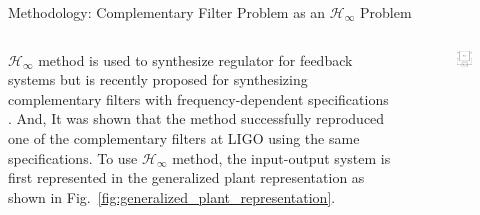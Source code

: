 \documentclass{beamer}
\begin{document}
\begin{frame}[t]
\begin{columns}[t]
\begin{column}{0.32\linewidth}
\begin{block}{Methodology: Complementary Filter Problem as an $\mathcal{H}_\infty$ Problem}
			\medskip
			
			\begin{columns}[t, onlytextwidth]
				\begin{column}{0.55\textwidth}
					$\mathcal{H}_\infty$ method is used to synthesize regulator for feedback systems but is recently proposed for synthesizing complementary filters with frequency-dependent specifications \cite{Thomas:2019}.
					And, It was shown that the method successfully reproduced one of the complementary filters at LIGO \cite{Matichard:2015} using the same specifications.
					To use $\mathcal{H}_\infty$ method, the input-output system is first represented in the generalized plant representation as shown in Fig.~\ref{fig:generalized_plant_representation}.
				\end{column}
				\begin{column}{0.45\textwidth}
					\begin{figure}
						\centering
						\includegraphics[width=0.5\linewidth]{generalized_plant}

\end{figure}
\end{column}
\end{columns}
\end{block}
\end{column}
\end{columns}
\end{frame}
\end{document}

